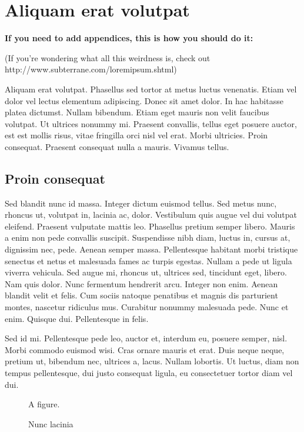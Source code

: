 \chapter{Aliquam erat volutpat}


\textbf{If you need to add appendices, this is how you should do it:}

(If you're wondering what all this weirdness is, check out\\
http://www.subterrane.com/loremipsum.shtml)

Aliquam erat volutpat. Phasellus sed tortor at metus luctus venenatis.
Etiam vel dolor vel lectus elementum adipiscing. Donec sit amet dolor. In
hac habitasse platea dictumst. Nullam bibendum. Etiam eget mauris non velit
faucibus volutpat. Ut ultrices nonummy mi. Praesent convallis, tellus eget
posuere auctor, est est mollis risus, vitae fringilla orci nisl vel erat.
Morbi ultricies. Proin consequat. Praesent consequat nulla a mauris.
Vivamus tellus. 

\section{Proin consequat}

Sed blandit nunc id massa. Integer dictum euismod tellus. Sed metus nunc,
rhoncus ut, volutpat in, lacinia ac, dolor. Vestibulum quis augue
vel dui volutpat eleifend. Praesent vulputate mattis leo. Phasellus pretium
semper libero. Mauris a enim non pede convallis suscipit. Suspendisse nibh
diam, luctus in, cursus at, dignissim nec, pede. Aenean semper massa.
Pellentesque habitant morbi tristique senectus et netus et malesuada fames ac
turpis egestas. Nullam a pede ut ligula viverra vehicula. Sed augue mi,
rhoncus ut, ultrices sed, tincidunt eget, libero. Nam quis dolor. Nunc
fermentum hendrerit arcu. Integer non enim. Aenean blandit velit et felis. Cum
sociis natoque penatibus et magnis dis parturient montes, nascetur ridiculus
mus. Curabitur nonummy malesuada pede. Nunc et enim. Quisque dui. Pellentesque
in felis. 

Sed id mi. Pellentesque pede leo, auctor et, interdum eu, posuere semper,
nisl. Morbi commodo euismod wisi. Cras ornare mauris et erat. Duis neque
neque, pretium ut, bibendum nec, ultrices a, lacus. Nullam lobortis. Ut
luctus, diam non tempus pellentesque, dui justo consequat ligula, eu
consectetuer tortor diam vel dui. 

\begin{figure}
    \begin{center}
        A figure.
        \caption{Nunc lacinia}
    \end{center}
\end{figure}

